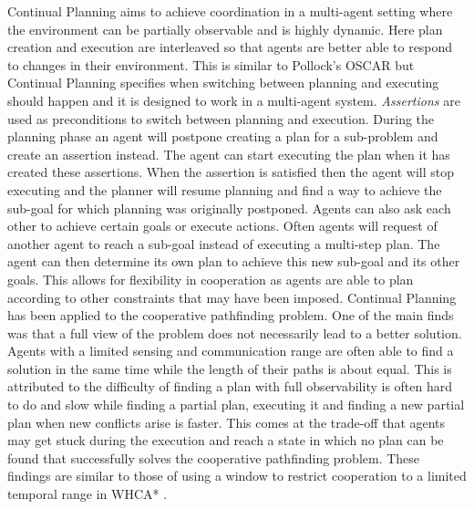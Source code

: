 Continual Planning \cite{brenner2008,brenner2009} aims to achieve coordination 
in a
multi-agent setting where the environment can be partially observable and is
highly dynamic. Here plan creation and execution are interleaved so that agents
are better able to respond to changes in their environment. This is similar to
Pollock's OSCAR \cite{pollock1995} but Continual Planning specifies when
switching between planning and executing should happen and it is designed to
work in a multi-agent system. \emph{Assertions} are used as preconditions to
switch between planning and execution. During the planning phase an agent will
postpone creating a plan for a sub-problem and create an assertion instead. The
agent can start executing the plan when it has created these assertions. When
the assertion is satisfied then the agent will stop executing and the planner
will resume planning and find a way to achieve the sub-goal for which planning
was originally postponed. Agents can also ask each other to achieve certain
goals or execute actions. Often agents will request of another agent to reach a
sub-goal instead of executing a multi-step plan. The agent can then determine
its own plan to achieve this new sub-goal and its other goals. This allows for
flexibility in cooperation as agents are able to plan according to other
constraints that may have been imposed. Continual Planning has been
applied to the cooperative pathfinding problem. One of the main finds was that
a full view of the problem does not necessarily lead to a better solution.
Agents with a limited sensing and communication range are often able to find a
solution in the same time while the length of their paths is about equal. This
is attributed to the difficulty of finding a plan with full observability is
often hard to do and slow while finding a partial plan, executing it and
finding a new partial plan when new conflicts arise is faster. This comes at the
trade-off that agents may get stuck during the execution and reach a state in
which no plan can be found that successfully solves the cooperative pathfinding
problem. These findings are similar to those of using a window to restrict
cooperation to a limited temporal range in WHCA* \cite{silver2005}.